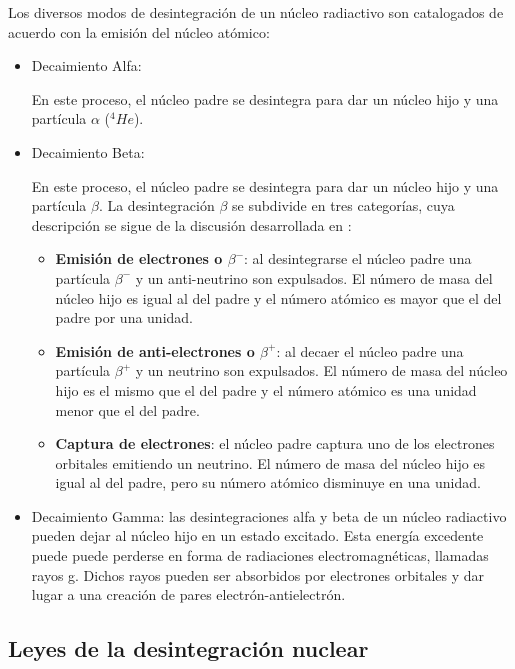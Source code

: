 Los diversos modos de desintegración de un núcleo radiactivo son catalogados de acuerdo con la emisión del núcleo atómico:

\begin{itemize}
	\item Decaimiento Alfa:
	
	En este proceso, el núcleo padre se desintegra para dar un núcleo hijo y una partícula $\alpha$ ($^{4} He$). 
	
	\item Decaimiento Beta:
	
	En este proceso, el núcleo padre se desintegra para dar un núcleo hijo y una partícula $\beta $. La desintegración $\beta $ se subdivide en tres categorías, cuya descripción se sigue de la discusión desarrollada en \cite{Cottingham.2001, Krane.1987, Das.2009, Martin.2009}: 
	
    \begin{itemize}
    	\item \textbf{Emisión de electrones o $\beta^{-}$}: al desintegrarse el núcleo padre una partícula $\beta ^{-}$ y un anti-neutrino son expulsados. El número de masa del núcleo hijo es igual al del padre y el número atómico es mayor que el del padre por una unidad. 
    	
    	\item \textbf{Emisión de anti-electrones o $\beta^{+}$}: al decaer el núcleo padre una partícula $\beta^{+}$ y un neutrino son expulsados. El número de masa del núcleo hijo es el mismo que el del padre y el número atómico es una unidad menor que el del padre. 
    	
    	\item \textbf{Captura de electrones}: el núcleo padre captura uno de los electrones orbitales emitiendo un neutrino. El número de masa del núcleo hijo es igual al del padre, pero su número atómico disminuye en una unidad. 
 	\end{itemize}
 
	\item Decaimiento Gamma: las desintegraciones alfa y beta de un núcleo radiactivo pueden dejar al núcleo hijo en un estado excitado. Esta energía excedente puede puede perderse en forma de radiaciones electromagnéticas, llamadas rayos g. Dichos rayos pueden ser absorbidos por electrones orbitales y dar lugar a una creación de pares electrón-antielectrón.
\end{itemize}

\subsection{Leyes de la desintegración nuclear}

